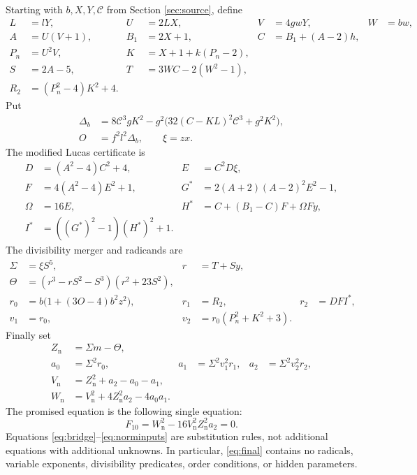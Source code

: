 \documentclass[11pt]{article}
\newcommand{\capC}{\mathscr C}
\theoremstyle{definition}
\theoremstyle{remark}
\numberwithin{equation}{section}
\begin{document}
Starting with \(b,X,Y,\capC\) from Section \ref{sec:source}, define
\begin{equation}\label{eq:bridge}
\begin{aligned}
 L&=lY,& U&=2LX,& V&=4gwY,& W&=bw,\\
 A&=U(V+1),& B_1&=2X+1,& C&=B_1+(A-2)h,\\
 P_n&=U^2V,& K&=X+1+k(P_n-2),\\
 S&=2A-5,& T&=3WC-2(W^2-1),\\
 R_2&=(P_n^2-4)K^2+4.
\end{aligned}
\end{equation}
Put
\begin{equation}\label{eq:positivity}
\begin{aligned}
 \Delta_b&=8\capC^3gK^2-
       g^2\bigl(32(C-KL)^2\capC^3+g^2K^2\bigr),\\
 O&=f^2l^2\Delta_b,\qquad \xi=zx.
\end{aligned}
\end{equation}
The modified Lucas certificate is
\begin{equation}\label{eq:lucas}
\begin{aligned}
 D&=(A^2-4)C^2+4,& E&=C^2D\xi,\\
 F&=4(A^2-4)E^2+1,&
 G^*&=2(A+2)(A-2)^2E^2-1,\\
 \Omega&=16E,&
 H^*&=C+(B_1-C)F+\Omega Fy,\\
 I^*&=((G^*)^2-1)(H^*)^2+1.
\end{aligned}
\end{equation}
The divisibility merger and radicands are
\begin{equation}\label{eq:merger}
\begin{aligned}
 \Sigma&=\xi S^5,& r&=T+Sy,\\
 \Theta&=(r^3-rS^2-S^3)(r^2+23S^2),\\
 r_0&=b\bigl(1+(3O-4)b^2z^2\bigr),&
 r_1&=R_2,&r_2&=DFI^*,\\
 v_1&=r_0,& v_2&=r_0(P_n^2+K^2+3).
\end{aligned}
\end{equation}
Finally set
\begin{equation}\label{eq:norminputs}
\begin{aligned}
 Z_{\mathrm n}&=\Sigma m-\Theta,\\
 a_0&=\Sigma^2r_0,&
 a_1&=\Sigma^2v_1^2r_1,&
 a_2&=\Sigma^2v_2^2r_2,\\
 V_{\mathrm n}&=Z_{\mathrm n}^2+a_2-a_0-a_1,\\
 W_{\mathrm n}&=V_{\mathrm n}^2+4Z_{\mathrm n}^2a_2-4a_0a_1.
\end{aligned}
\end{equation}
The promised equation is the following single equation:
\begin{equation}\label{eq:final}
 \boxed{\quad
 F_{10}=W_{\mathrm n}^2-16V_{\mathrm n}^2Z_{\mathrm n}^2a_2=0.
 \quad}
\end{equation}
Equations \eqref{eq:bridge}--\eqref{eq:norminputs} are substitution rules,
not additional equations with additional unknowns. In particular,
\eqref{eq:final} contains no radicals, variable exponents, divisibility
predicates, order conditions, or hidden parameters.
\end{document}
